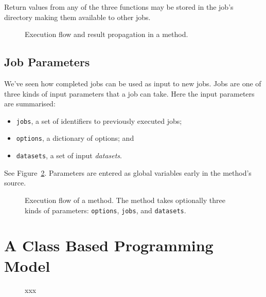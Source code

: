 Return values from any of the three functions may be stored in the
job's directory making them available to other jobs.


\begin{figure}[h!]
  \begin{center}
    
    \caption{Execution flow and result propagation in a method.}
    \label{fig:prepanasyn}
  \end{center}
\end{figure}



\subsection{Job Parameters}
\label{sec:jobparams}
We've seen how completed jobs can be used as input to new
jobs.  Jobs are one of three kinds of input parameters that
a job can take.  Here the input parameters are summarised:
\begin{itemize}
\item[] \texttt{jobs}, a set of identifiers to previously executed jobs;
\item[] \texttt{options}, a dictionary of options; and
\item[] \texttt{datasets}, a set of input \textsl{datasets}.
\end{itemize}
See Figure~\ref{fig:execflow}.  Parameters are entered as global
variables early in the method's source.


\begin{figure}[h!]
  \begin{center}
    
    \caption{Execution flow of a method.  The method takes optionally
      three kinds of parameters: \texttt{options}, \texttt{jobs},
      and \texttt{datasets}.}
    \label{fig:execflow}
  \end{center}
\end{figure}





\section{A Class Based Programming Model}

\begin{figure}[h!]
  \begin{center}
    
    \caption{xxx}
    \label{fig:classes}
  \end{center}
\end{figure}

